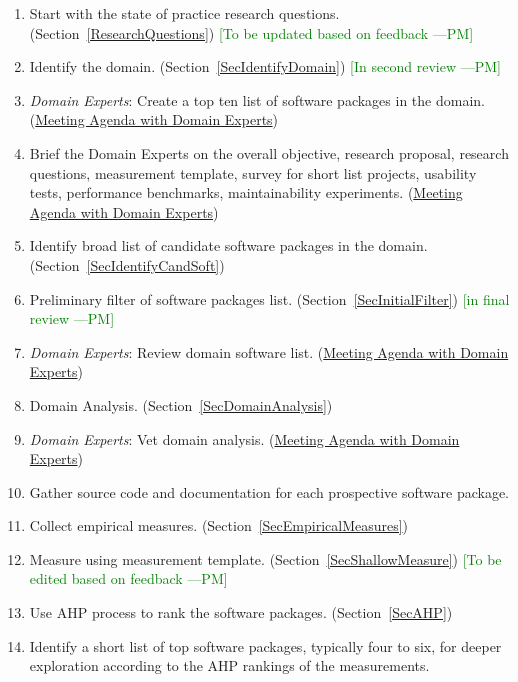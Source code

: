 \documentclass[letterpaper,cleveref]{lipics-v2019}
\newcommand{\authornote}[3]{\textcolor{#1}{[#3 ---#2]}}
\newcommand{\authornote}[3]{}
\newcommand{\pmi}[1]{\authornote{green}{PM}{#1}} %
\theoremstyle{definition}
\begin{document}
\begin{enumerate}
\item Start with the state of practice research questions. (Section~\ref{ResearchQuestions}) \pmi{To be updated based on feedback}
\item Identify the domain. (Section~\ref{SecIdentifyDomain}) \pmi{In second review}
\item \emph{Domain Experts}: Create a top ten list of software packages in the domain. (\href{https://github.com/smiths/AIMSS/blob/master/StateOfPractice/Methodology/Meeting Agenda withmDomainmExperts.pdf}{Meeting Agenda with Domain Experts})
\item Brief the Domain Experts on the overall objective, research proposal, research questions, measurement template, survey for short list projects, usability tests, performance benchmarks, maintainability experiments. (\href{https://github.com/smiths/AIMSS/blob/master/StateOfPractice/Methodology/Meeting Agenda withmDomainmExperts.pdf}{Meeting Agenda with Domain Experts})
\item Identify broad list of candidate software packages in the domain. (Section~\ref{SecIdentifyCandSoft})
\item Preliminary filter of software packages list. (Section~\ref{SecInitialFilter}) \pmi{in final review}
\item \emph{Domain Experts}: Review domain software list. (\href{https://github.com/smiths/AIMSS/blob/master/StateOfPractice/Methodology/Meeting Agenda withmDomainmExperts.pdf}{Meeting Agenda with Domain Experts})
\item Domain Analysis. (Section~\ref{SecDomainAnalysis})
\item \emph{Domain Experts}: Vet domain analysis. (\href{https://github.com/smiths/AIMSS/blob/master/StateOfPractice/Methodology/Meeting Agenda withmDomainmExperts.pdf}{Meeting Agenda with Domain Experts}) 
\item Gather source code and documentation for each prospective software package.
\item Collect empirical measures. (Section~\ref{SecEmpiricalMeasures})
\item Measure using measurement template. (Section~\ref{SecShallowMeasure}) \pmi{To be edited based on feedback}
\item Use AHP process to rank the software packages. (Section~\ref{SecAHP})
\item Identify a short list of top software packages, typically four to six, for deeper exploration according to the AHP rankings of the measurements.

\end{enumerate}
\end{document}
